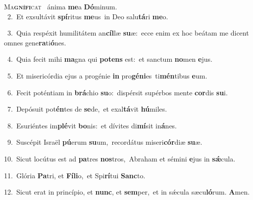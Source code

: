 \lettrine{\initial\textcolor{\initialcolor}{M}}{a\-\textbf{gní}\-\textbf{fi}cat~\star} ánima \textbf{me}\-a \textbf{Dó}\-minum.\\
{\numbfont\textcolor{\numbcolor}{~2.}}~Et exsultávit \textbf{spí}\-ritus \textbf{me}\-us~\star in Deo salu\-\textbf{tá}\-ri \textbf{me}\-o.\par
{\numbfont\textcolor{\numbcolor}{~3.}}~Quia respéxit humilitátem an\-\textbf{cíl}\-læ \textbf{su}\-æ:~\star ecce enim ex hoc beátam me dicent omnes gene\-\textbf{ra}\-ti\-\textbf{ó}\-nes.\par
{\numbfont\textcolor{\numbcolor}{~4.}}~Quia fecit mihi \textbf{ma}\-gna qui \textbf{pot}\-\textbf{ens} est:~\star et sanctum \textbf{no}\-men \textbf{e}\-jus.\par
{\numbfont\textcolor{\numbcolor}{~5.}}~Et misericórdia ejus a progénie \textbf{in} pro\-\textbf{gé}\-\textbf{ni}es~\star ti\-\textbf{mén}\-tibus \textbf{e}\-um.\par
{\numbfont\textcolor{\numbcolor}{~6.}}~Fecit poténtiam in \textbf{brá}\-chio \textbf{su}\-o:~\star dispérsit supérbos mente \textbf{cor}\-dis \textbf{su}\-i.\par
{\numbfont\textcolor{\numbcolor}{~7.}}~Depósuit pot\-\textbf{én}\-tes de \textbf{se}\-de,~\star et exal\-\textbf{tá}\-vit \textbf{hú}\-miles.\par
{\numbfont\textcolor{\numbcolor}{~8.}}~Esuriéntes im\-\textbf{plé}\-vit \textbf{bo}\-nis:~\star et dívites di\-\textbf{mí}\-sit in\-\textbf{á}\-nes.\par
{\numbfont\textcolor{\numbcolor}{~9.}}~Suscépit Israël \textbf{pú}\-erum \textbf{su}\-um,~\star recordátus miseri\-\textbf{cór}\-diæ \textbf{su}\-æ.\par
{\numbfont\textcolor{\numbcolor}{10.}}~Sicut locútus est ad \textbf{pa}\-tres \textbf{nos}\-tros,~\star Abraham et sémini \textbf{e}\-jus in \textbf{sǽ}\-cula.\par
{\numbfont\textcolor{\numbcolor}{11.}}~Glória \textbf{Pa}\-tri, et \textbf{Fí}\-\textbf{li}o,~\star et Spi\-\textbf{rí}\-tui \textbf{Sanc}\-to.\par
{\numbfont\textcolor{\numbcolor}{12.}}~Sicut erat in princípio, et \textbf{nunc}\-, et \textbf{sem}\-per,~\star et in sǽcula sæcu\-\textbf{ló}\-rum. \textbf{A}\-men.\par
